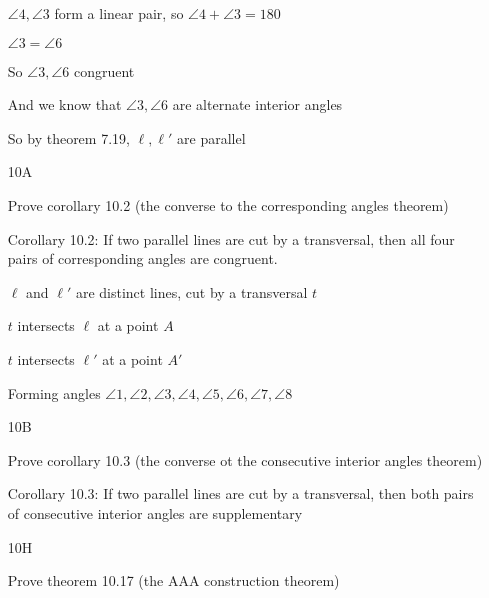 \documentclass[11pt]{article}
\begin{document}
\begin{itemize}
		$\angle 4, \angle 3$ form a linear pair, so $\angle 4 + \angle 3 = 180$

		$\angle 3 = \angle 6$

		So $\angle 3, \angle 6$ congruent

		And we know that $\angle 3, \angle 6$ are alternate interior angles

		So by theorem 7.19, $\ell, \ell'$ are parallel

	\item[10A]

		Prove corollary 10.2 (the converse to the corresponding angles theorem)

		Corollary 10.2: If two parallel lines are cut by a transversal, then all four pairs of corresponding angles are congruent.

		$\ell$ and $\ell'$ are distinct lines, cut by a transversal $t$

		$t$ intersects $\ell$ at a point $A$

		$t$ intersects $\ell'$ at a point $A'$

		Forming angles $\angle 1, \angle 2, \angle 3, \angle 4, \angle 5, \angle 6, \angle 7, \angle 8$



	\item[10B]

		Prove corollary 10.3 (the converse ot the consecutive interior angles theorem)

		Corollary 10.3: If two parallel lines are cut by a transversal, then both pairs of consecutive interior angles are supplementary

	\item[10H]

		Prove theorem 10.17 (the AAA construction theorem)



\end{itemize}
\end{document}
